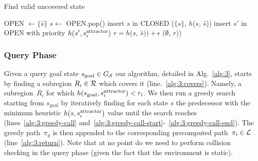 \documentclass[a4paper]{report}
\begin{document}
\begin{algorithm}[t]
\caption{Find valid uncovered state}\label{alg:3b}

\begin{algorithmic}[1]
\State OPEN $\leftarrow \{\hat{s}\}$
  \State $s \leftarrow$ OPEN.pop()
  \State insert $s$ in CLOSED
    \State \Return ($\{s\}$, $h$($s$, $\hat{s}$))
  \EndIf
        \State insert $s'$ in OPEN with priority $h(s', s^{\text{attractor}}_i)$
    \EndIf
  \EndFor
\EndWhile
\State $r = h$($s$, $\hat{s})) + \epsilon$    
\State \Return ($\emptyset$, $r$))
\EndProcedure
\end{algorithmic}
\end{algorithm}


\subsubsection{Query Phase}
Given a query goal state $s_{\text{goal}} \in G_\mathcal{S}$ 
our algorithm, detailed in Alg.~\ref{alg:3}, starts by finding a subregion $R_i \in \mathcal{R}$ which covers it (line.~\ref{alg:3:covers}). Namely, a subregion~$R_i$ for which 
$h(s_{\text{goal}}, s^{\text{attractor}}_i) < r_i$.
We then run a greedy search starting from $s_{\text{goal}}$ by iteratively finding for each state $s$ the predecessor with the minimum heuristic $h(s, s^{\text{attractor}}_i)$ value until the search reaches \sAttract (lines~\ref{alg:3:greedy-call} and~\ref{alg:3:greedy-call-start}-~\ref{alg:3:greedy-call-end}). 
The greedy path~$\pi_g$ is then appended to the corresponding precomputed path~$\pi_i \in \mathcal{L}$ (line~\ref{alg:3:return}). 
Note that at no point do we need to perform collision checking in the query phase (given the fact that the environment is static).
\end{document}
